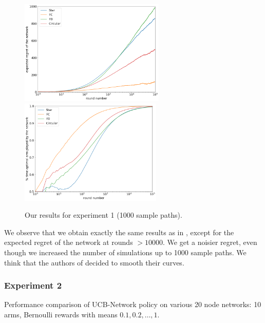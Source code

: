 \documentclass{article}
\begin{document}
\begin{figure}[H]
  \centering
  \includegraphics[height=5cm]{fig1_1_ours.png}
  \includegraphics[height=5cm]{fig1_2_ours.png}
  \caption{Our results for experiment 1 (1000 sample paths).}
\end{figure}

We observe that we obtain exactly the same results as in \cite{DBLP:journals/corr/KollaJG16}, except for the expected regret of the network at rounds $ > 10000$. We get a noisier regret, even though we increased the number of simulations up to 1000 sample paths. We think that the authors of \cite{DBLP:journals/corr/KollaJG16} decided to smooth their curves.

\subsubsection{Experiment 2}

Performance comparison of UCB-Network policy on various 20 node networks: 10 arms, Bernoulli rewards with means $0.1, 0.2, \dots, 1$.
\end{document}
